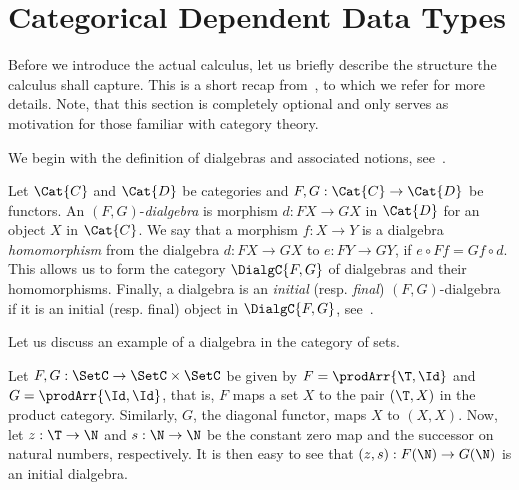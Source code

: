 \documentclass[preprint]{sigplanconf}
\begin{document}
 \section{Categorical Dependent Data Types}
\label{sec:dtcc}

Before we introduce the actual calculus, let us briefly describe the structure
the calculus shall capture.
This is a short recap from~\cite{Basold-DepCoindFibDialg}, to which we refer
for more details.
Note, that this section is completely optional and only serves as
motivation for those familiar with category theory.

We begin with the definition of dialgebras and associated notions,
see~\cite{Hagino-Dialg}.
\begin{definition}
  \label{def:dialgebra}
  Let $\Cat{C}$ and $\Cat{D}$ be categories and $F, G : \Cat{C} \to \Cat{D}$ be
  functors.
  An $(F, G)$-\emph{dialgebra} is morphism $d : F X \to G X$ in $\Cat{D}$ for
  an object $X$ in $\Cat{C}$.
  We say that a morphism $f : X \to Y$ is a dialgebra \emph{homomorphism}
  from the dialgebra $d : F X \to G X$ to
  $e : F Y \to G Y$, if $e \circ Ff = Gf \circ d$.
  This allows us to form the category $\DialgC{F, G}$ of dialgebras and their
  homomorphisms.
  Finally, a dialgebra is an \emph{initial} (resp. \emph{final})
  $(F,G)$-dialgebra if it is an initial (resp. final) object in $\DialgC{F, G}$,
  see~\cite{Basold-DepCoindFibDialg}.
\end{definition}

Let us discuss an example of a dialgebra in the category of sets.
\begin{example}
  Let $F, G : \SetC \to \SetC \times \SetC$ be given by
  $F = \prodArr{\T, \Id}$ and $G = \prodArr{\Id, \Id}$, that is, $F$ maps a
  set $X$ to the pair $(\T, X)$ in the product category.
  Similarly, $G$, the diagonal functor, maps $X$ to $(X, X)$.
  Now, let $z : \T \to \N$ and $s : \N \to \N$ be the constant zero map
  and the successor on natural numbers, respectively.
  It is then easy to see that $(z, s) : F (\N) \to G (\N)$ is an initial
  dialgebra.
  \qedDef
\end{example}
\end{document}
